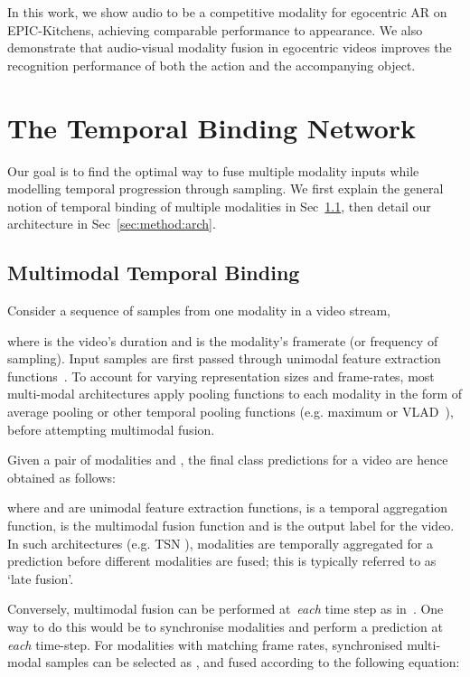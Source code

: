 \documentclass[10pt,twocolumn,letterpaper]{article}
\begin{document}
In this work, we show audio to be a competitive modality for egocentric AR on EPIC-Kitchens, achieving comparable performance to appearance. We also demonstrate that audio-visual modality fusion in egocentric videos improves the recognition performance of both the action and the accompanying object.  



\vspace*{-1pt}
\section{The Temporal Binding Network}
\label{sec:tbw}
\vspace*{-3pt}
Our goal is to find the optimal way to fuse multiple modality inputs while modelling temporal progression through sampling. 
We first explain the general notion of temporal binding of multiple modalities in Sec~\ref{sec:method:tbw}, then detail our architecture in Sec~\ref{sec:method:arch}. 

\subsection{Multimodal Temporal Binding}
\label{sec:method:tbw}
Consider a sequence of samples from one modality in a video stream,

where  is the video's duration and  is the modality's framerate (or frequency of sampling).
Input samples are first passed through unimodal feature extraction functions~.
To account for varying representation sizes and frame-rates, most multi-modal architectures apply pooling functions  to each modality in the form of average pooling or other temporal pooling functions (e.g. maximum or VLAD~\cite{Jegou2010}), before attempting multimodal fusion. 

Given a pair of modalities  and , the final class predictions for a video are hence obtained as follows:

where  and  are unimodal feature extraction functions,  is a temporal aggregation function,  is the multimodal fusion function and  is the output label for the video. 
In such architectures (e.g. TSN \cite{TSN2016ECCV}), modalities are temporally aggregated for a prediction before different modalities are fused; this is typically referred to as `late fusion'. 

Conversely, multimodal fusion can be performed at~\textit{each} time step as in~\cite{Feichtenhofer_2016_CVPR}. One way to do this would be to synchronise modalities and perform a prediction at \textit{each} time-step. For modalities with matching frame rates, synchronised multi-modal samples can be selected as , and fused according to the following equation:
\end{document}
